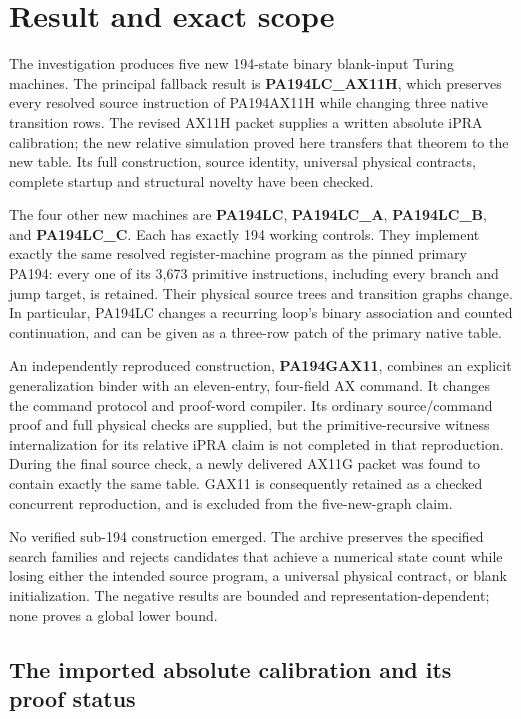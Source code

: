 \documentclass[11pt,a4paper]{article}
\begin{document}
\section{Result and exact scope}

The investigation produces five new 194-state binary blank-input Turing
machines. The principal fallback result is \textbf{PA194LC\_AX11H}, which
preserves every resolved source instruction of PA194AX11H while changing
three native transition rows. The revised AX11H packet supplies a written
absolute iPRA calibration; the new relative simulation proved here
transfers that theorem to the new table. Its full construction, source
identity, universal physical contracts, complete startup and structural
novelty have been checked.

The four other new machines are
\textbf{PA194LC}, \textbf{PA194LC\_A}, \textbf{PA194LC\_B}, and
\textbf{PA194LC\_C}. Each has exactly 194 working controls. They implement
exactly the same resolved register-machine program as the pinned primary
PA194: every one of its 3,673 primitive instructions, including every
branch and jump target, is retained. Their physical source trees and
transition graphs change. In particular, PA194LC changes a recurring
loop's binary association and counted continuation, and can be given as a
three-row patch of the primary native table.

An independently reproduced construction, \textbf{PA194GAX11}, combines an explicit
generalization binder with an eleven-entry, four-field AX command. It
changes the command protocol and proof-word compiler. Its ordinary
source/command proof and full physical checks are supplied, but the
primitive-recursive witness internalization for its relative iPRA claim
is not completed in that reproduction. During the final source check,
a newly delivered AX11G packet was found to contain exactly the same
table. GAX11 is consequently retained as a checked concurrent
reproduction, and is excluded from the five-new-graph claim.

No verified sub-194 construction emerged. The archive preserves the
specified search families and rejects candidates that achieve a numerical
state count while losing either the intended source program, a universal
physical contract, or blank initialization. The negative results are
bounded and representation-dependent; none proves a global lower bound.

\subsection{The imported absolute calibration and its proof status}
\end{document}
